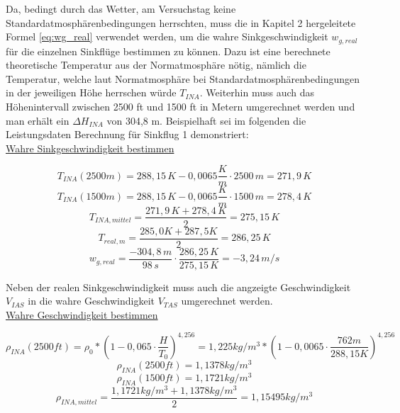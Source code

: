 \noindent Da, bedingt durch das Wetter, am Versuchstag keine Standardatmosphärenbedingungen herrschten, muss die in Kapitel 2 hergeleitete Formel \ref{eq:wg_real} verwendet werden, um die wahre Sinkgeschwindigkeit $w_{g,real}$ für die einzelnen Sinkflüge bestimmen zu können. Dazu ist eine berechnete theoretische Temperatur aus der Normatmosphäre nötig, nämlich die Temperatur, welche laut Normatmosphäre bei Standardatmosphärenbedingungen in der jeweiligen Höhe herrschen würde $T_{INA}$. Weiterhin muss auch das Höhenintervall zwischen 2500 ft und 1500 ft in Metern umgerechnet werden und man erhält ein $\Delta H_{INA}$ von 304,8 m. Beispielhaft sei im folgenden die Leistungsdaten Berechnung für Sinkflug 1 demonstriert:\\

\noindent 
\underline{Wahre Sinkgeschwindigkeit bestimmen}

\begin{equation}
T_{INA}(2500m) = 288,15\,K - 0,0065 \frac{K}{m} \cdot 2500\,m = 271,9\,K
\end{equation}
\begin{equation}
T_{INA}(1500m) = 288,15\,K - 0,0065 \frac{K}{m} \cdot 1500\,m = 278,4\,K
\end{equation}
\begin{equation}
T_{INA,mittel} = \frac{271,9\,K + 278,4\,K}{2} = 275,15\,K
\end{equation}
\begin{equation}
T_{real,m} = \frac{285,0 K + 287,5 K}{2} =	286,25\,K
\end{equation}
\begin{equation}
w_{g,real} = \frac{-304,8\,m}{98\,s} \cdot \frac{286,25\,K}{275,15\,K} = - 3,24\,m/s
\end{equation}

\vspace{5mm}
\noindent Neben der realen Sinkgeschwindigkeit muss auch die angzeigte Geschwindigkeit $V_{IAS}$ in die wahre Geschwindigkeit $V_{TAS}$ umgerechnet werden.\\


\noindent
\underline{Wahre Geschwindigkeit bestimmen}

\begin{equation}
\rho_{INA}(2500ft) = \rho_0 * (1-0,065\cdot \frac{H}{T_0})^{4,256} = 1,225 kg/m^3 * (1-0,0065\cdot \frac{762 m}{288,15 K})^{4,256}
\end{equation}
\begin{equation}
\rho_{INA}(2500ft) = 1,1378 kg/m^3
\end{equation}
\begin{equation}
\rho_{INA}(1500ft) = 1,1721 kg/m^3
\end{equation}
\begin{equation}
\rho_{INA,mittel} = \frac{1,1721 kg/m^3+1,1378 kg/m^3}{2} = 1,15495 kg/m^3
\end{equation}

